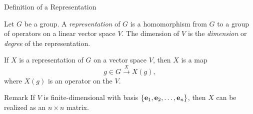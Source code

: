\documentclass[compress,aspectratio=169,10pt,usenames,dvipsnames]{beamer}
\begin{document}
\begin{frame}{Definition of a Representation}

\vfill

\begin{definition}
  Let $G$ be a group. A \textit{representation} of $G$ is a homomorphism from $G$ to a group of operators on a linear vector space $V$. The dimension of $V$ is the \textit{dimension} or \textit{degree} of the representation.
\end{definition}

\vfill

If $X$ is a representation of $G$ on a vector space $V$, then $X$ is a map
\vspace*{-.5em}
\begin{equation*}
    g\in G\xrightarrow{X} X(g),
\end{equation*}
where $X(g)$ is an operator on the $V$.

\vfill

\begin{block}{Remark}
  If $V$ is finite-dimensional with basis $\left\{ \mathbf{e}_1,\mathbf{e}_2,\dots,\mathbf{e}_n \right\}$, then $X$ can be realized as an $n\times n$ matrix.
\end{block}

\vfill


\end{frame}

\end{document}
